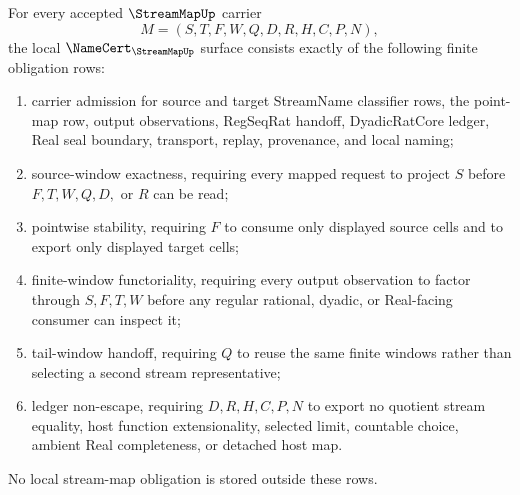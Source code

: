 \begin{theorem}
\label{thm:stream-map-namecert-obligation-surface}
For every accepted $\StreamMapUp$ carrier
$$
M=(S,T,F,W,Q,D,R,H,C,P,N),
$$
the local $\NameCert_{\StreamMapUp}$ surface consists exactly of the following finite obligation rows:
\begin{enumerate}
\item carrier admission for source and target StreamName classifier rows, the point-map row, output observations, RegSeqRat handoff, DyadicRatCore ledger, Real seal boundary, transport, replay, provenance, and local naming;
\item source-window exactness, requiring every mapped request to project $S$ before $F,T,W,Q,D,$ or $R$ can be read;
\item pointwise stability, requiring $F$ to consume only displayed source cells and to export only displayed target cells;
\item finite-window functoriality, requiring every output observation to factor through $S,F,T,W$ before any regular rational, dyadic, or Real-facing consumer can inspect it;
\item tail-window handoff, requiring $Q$ to reuse the same finite windows rather than selecting a second stream representative;
\item ledger non-escape, requiring $D,R,H,C,P,N$ to export no quotient stream equality, host function extensionality, selected limit, countable choice, ambient Real completeness, or detached host map.
\end{enumerate}
No local stream-map obligation is stored outside these rows.
\end{theorem}

